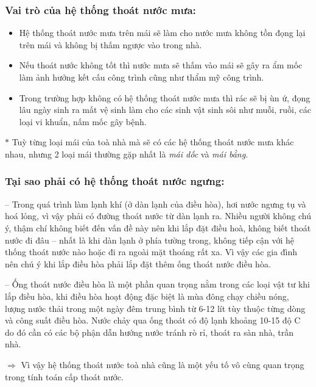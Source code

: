 	\subsubsection{Vai trò của hệ thống thoát nước mưa:}
	\begin{itemize}
		\vspace{-2mm}
		\setlength\itemsep{1mm}
		\item Hệ thống thoát nước mưa trên mái sẽ làm cho nước mưa không tồn đọng lại trên mái và không bị thấm ngược vào trong nhà.
		\item Nếu thoát nước không tốt thì nước mưa sẽ thấm vào mái sẽ gây ra ẩm mốc làm ảnh hưởng kết cấu công trình cũng như thẩm mỹ công trình.
		\item Trong trường hợp không có hệ thống thoát nước mưa thì rác sẽ bị ùn ứ, đọng lâu ngày sinh ra mất vệ sinh làm cho các sinh vật sinh sôi như muỗi, ruồi, các loại vi khuẩn, nấm mốc gây bệnh.
	\end{itemize}
	
	$\ast$ Tuỳ từng loại mái của toà nhà mà sẽ có các hệ thống thoát nước mưa khác nhau, nhưng 2 loại mái thường gặp nhất là \emph{mái dốc} và \emph{mái bằng}.
	
	\subsubsection{Tại sao phải có hệ thống thoát nước ngưng:}
	-- Trong quá trình làm lạnh khí (ở dàn lạnh của điều hòa), hơi nước ngưng tụ và hoá lỏng, vì vậy phải có đường thoát nước từ dàn lạnh ra. Nhiều người không chú ý, thậm chí không biết đến vấn đề này nên khi lắp đặt điều hoà, không biết thoát nước đi đâu – nhất là khi dàn lạnh ở phía tường trong, không tiếp cận với hệ thống thoát nước nào hoặc đi ra ngoài mặt thoáng rất xa. Vì vậy các gia đình nên chú ý khi lắp điều hòa phải lắp đặt thêm ống thoát nước điều hòa.

-- Ống thoát nước điều hòa là một phần quan trọng nằm trong các loại vật tư khi lắp điều hòa, khi điều hòa hoạt động đặc biệt là mùa đông chạy chiều nóng, lượng nước thải trong một ngày đêm trung bình từ 6-12 lít tùy thuộc từng dòng và công suất điều hòa. Nước chảy qua ống thoát có độ lạnh khoảng 10-15 độ C do đó cần có các bộ phận dẫn hướng nước tránh rò rỉ, thoát ra sàn nhà, trần nhà.
	
	\vspace{0.5cm}$\pmb{\Rightarrow}$ Vì vậy hệ thống thoát nước toà nhà cũng là một yếu tố vô cùng quan trọng trong tính toán cấp thoát nước.
	
